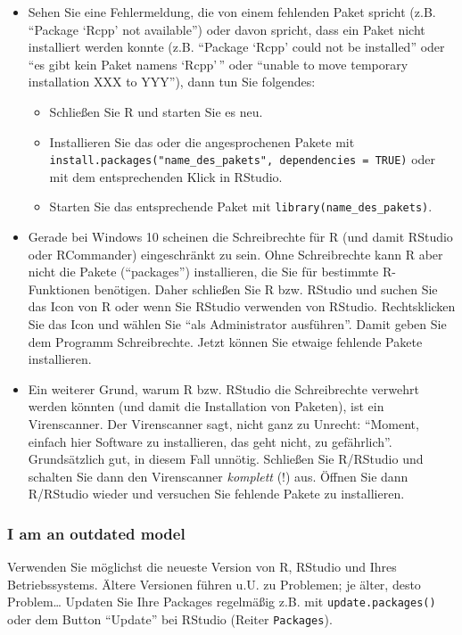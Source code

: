 \documentclass[12pt,ngerman,]{book}
\providecommand{\tightlist}{%
  \setlength{\itemsep}{0pt}\setlength{\parskip}{0pt}}
\theoremstyle{definition}
\theoremstyle{definition}
\theoremstyle{remark}
\begin{document}
\begin{itemize}
\item
  Sehen Sie eine Fehlermeldung, die von einem fehlenden Paket spricht
  (z.B. ``Package `Rcpp' not available'') oder davon spricht, dass ein
  Paket nicht installiert werden konnte (z.B. ``Package `Rcpp' could not
  be installed'' oder ``es gibt kein Paket namens `Rcpp'\,'' oder
  ``unable to move temporary installation XXX to YYY''), dann tun Sie
  folgendes:

  \begin{itemize}
  \tightlist
  \item
    Schließen Sie R und starten Sie es neu.
  \item
    Installieren Sie das oder die angesprochenen Pakete mit
    \texttt{install.packages("name\_des\_pakets",\ dependencies\ =\ TRUE)}
    oder mit dem entsprechenden Klick in RStudio.
  \item
    Starten Sie das entsprechende Paket mit
    \texttt{library(name\_des\_pakets)}.
  \end{itemize}
\item
  Gerade bei Windows 10 scheinen die Schreibrechte für R (und damit
  RStudio oder RCommander) eingeschränkt zu sein. Ohne Schreibrechte
  kann R aber nicht die Pakete (``packages'') installieren, die Sie für
  bestimmte R-Funktionen benötigen. Daher schließen Sie R bzw. RStudio
  und suchen Sie das Icon von R oder wenn Sie RStudio verwenden von
  RStudio. Rechtsklicken Sie das Icon und wählen Sie ``als Administrator
  ausführen''. Damit geben Sie dem Programm Schreibrechte. Jetzt können
  Sie etwaige fehlende Pakete installieren.
\item
  Ein weiterer Grund, warum R bzw. RStudio die Schreibrechte verwehrt
  werden könnten (und damit die Installation von Paketen), ist ein
  Virenscanner. Der Virenscanner sagt, nicht ganz zu Unrecht: ``Moment,
  einfach hier Software zu installieren, das geht nicht, zu
  gefährlich''. Grundsätzlich gut, in diesem Fall unnötig. Schließen Sie
  R/RStudio und schalten Sie dann den Virenscanner \emph{komplett} (!)
  aus. Öffnen Sie dann R/RStudio wieder und versuchen Sie fehlende
  Pakete zu installieren.
\end{itemize}

\subsubsection{I am an outdated model}\label{i-am-an-outdated-model}

Verwenden Sie möglichst die neueste Version von R, RStudio und Ihres
Betriebssystems. Ältere Versionen führen u.U. zu Problemen; je älter,
desto Problem\ldots{} Updaten Sie Ihre Packages regelmäßig z.B. mit
\texttt{update.packages()} oder dem Button ``Update'' bei RStudio
(Reiter \texttt{Packages}).
\end{document}
